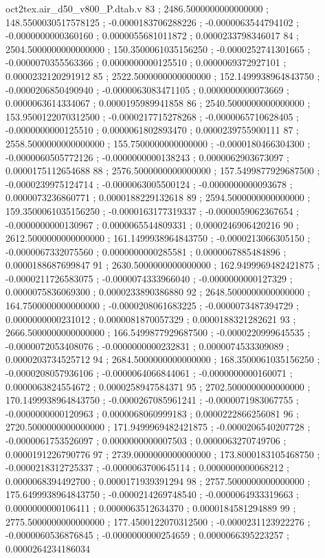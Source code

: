 \begin{filecontents}[overwrite]{oct2tex.air_d50_v800_P.dtab.v}
83 ; 2486.5000000000000000 ; 148.5500030517578125 ; -0.0000183706288226 ; -0.0000063544794102 ; -0.0000000000360160 ; 0.0000055681011872 ; 0.0000233798346017
84 ; 2504.5000000000000000 ; 150.3500061035156250 ; -0.0000252741301665 ; -0.0000070355563366 ; 0.0000000000125510 ; 0.0000069372927101 ; 0.0000232120291912
85 ; 2522.5000000000000000 ; 152.1499938964843750 ; -0.0000206850490940 ; -0.0000063083471105 ; 0.0000000000073669 ; 0.0000063614334067 ; 0.0000195989941858
86 ; 2540.5000000000000000 ; 153.9500122070312500 ; -0.0000217715278268 ; -0.0000065710628405 ; -0.0000000000125510 ; 0.0000061802893470 ; 0.0000239755900111
87 ; 2558.5000000000000000 ; 155.7500000000000000 ; -0.0000180466304300 ; -0.0000060505772126 ; -0.0000000000138243 ; 0.0000062903673097 ; 0.0000175112654688
88 ; 2576.5000000000000000 ; 157.5499877929687500 ; -0.0000239975124714 ; -0.0000063005500124 ; -0.0000000000093678 ; 0.0000073236860771 ; 0.0000188229132618
89 ; 2594.5000000000000000 ; 159.3500061035156250 ; -0.0000163177319337 ; -0.0000059062367654 ; -0.0000000000130967 ; 0.0000065544809331 ; 0.0000246906420216
90 ; 2612.5000000000000000 ; 161.1499938964843750 ; -0.0000213066305150 ; -0.0000067332075560 ; 0.0000000000285581 ; 0.0000067885484896 ; 0.0000188687699847
91 ; 2630.5000000000000000 ; 162.9499969482421875 ; -0.0000211726583075 ; -0.0000074333966040 ; -0.0000000000127329 ; 0.0000075836069300 ; 0.0000233890386880
92 ; 2648.5000000000000000 ; 164.7500000000000000 ; -0.0000208061683225 ; -0.0000073487394729 ; 0.0000000000231012 ; 0.0000081870057329 ; 0.0000188321282621
93 ; 2666.5000000000000000 ; 166.5499877929687500 ; -0.0000220999645535 ; -0.0000072053408076 ; -0.0000000000232831 ; 0.0000074533309089 ; 0.0000203734525712
94 ; 2684.5000000000000000 ; 168.3500061035156250 ; -0.0000208057936106 ; -0.0000064066844061 ; -0.0000000000160071 ; 0.0000063824554672 ; 0.0000258947584371
95 ; 2702.5000000000000000 ; 170.1499938964843750 ; -0.0000267085961241 ; -0.0000071983067755 ; -0.0000000000120963 ; 0.0000068060999183 ; 0.0000222866256081
96 ; 2720.5000000000000000 ; 171.9499969482421875 ; -0.0000206540207728 ; -0.0000061753526097 ; 0.0000000000007503 ; 0.0000063270749706 ; 0.0000191226790776
97 ; 2739.0000000000000000 ; 173.8000183105468750 ; -0.0000218312725337 ; -0.0000063700645114 ; 0.0000000000068212 ; 0.0000068394492700 ; 0.0000171939391294
98 ; 2757.5000000000000000 ; 175.6499938964843750 ; -0.0000214269748540 ; -0.0000064933319663 ; 0.0000000000106411 ; 0.0000063512634370 ; 0.0000184581294889
99 ; 2775.5000000000000000 ; 177.4500122070312500 ; -0.0000231123922276 ; -0.0000060536876845 ; -0.0000000000254659 ; 0.0000066395223257 ; 0.0000264234186034

\end{filecontents}
